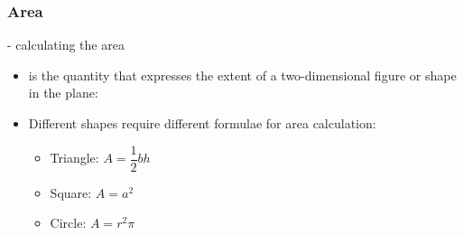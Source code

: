 \begin{frame}
  \frametitle{Area}
  \begin{module}[id=area]
  - calculating the area\\
      \begin{itemize}
      \item
      \begin{definition}[id=area.def]
         is the quantity that expresses the extent of a two-dimensional figure or shape in the plane:
      \end{definition}
    \end{itemize}
\begin{itemize}
\item Different shapes require different formulae for area calculation:
  	\begin{itemize}
  	\item Triangle: $A = \dfrac{1}{2}bh$
  	\item Square: $A = a^2$
    \item Circle: $A = r^2\pi$
	\end{itemize}
\end{itemize}
\end{module}
\end{frame}

